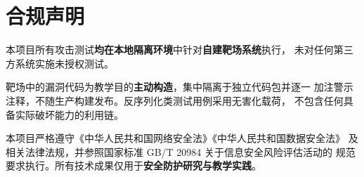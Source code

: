 \section{合规声明}
\setcounter{table}{0}

\begin{warnbox}
本项目所有攻击测试\textbf{均在本地隔离环境}中针对\textbf{自建靶场系统}执行，
未对任何第三方系统实施未授权测试。

靶场中的漏洞代码为教学目的\textbf{主动构造}，集中隔离于独立代码包并逐一
加注警示注释，不随生产构建发布。反序列化类测试用例采用无害化载荷，
不包含任何具备实际破坏能力的利用链。

本项目严格遵守《中华人民共和国网络安全法》《中华人民共和国数据安全法》
及相关法律法规，并参照国家标准 GB/T 20984 关于信息安全风险评估活动的
规范要求执行。所有技术成果仅用于\textbf{安全防护研究与教学实践}。
\end{warnbox}

